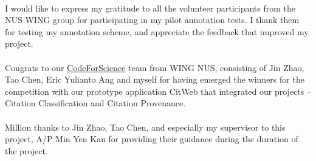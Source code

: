 \documentclass[hyp, 12pt]{socreport}
\begin{document}
\begin{acknowledgement}
\paragraph{}
I would like to express my gratitude to all the volunteer participants from the NUS WING group for participating in my pilot annotation tests. I thank them for testing my annotation scheme, and appreciate the feedback that improved my project.

\paragraph{}
Congrats to our \url{CodeForScience} team from WING NUS, consisting of Jin Zhao, Tao Chen, Eric Yulianto Ang and myself for having emerged the winners for the competition with our prototype application CitWeb that integrated our projects -- Citation Classification and Citation Provenance.

\paragraph{}
Million thanks to Jin Zhao, Tao Chen, and especially my supervisor to this project, A/P Min Yen Kan for providing their guidance during the duration of the project.
\end{acknowledgement}

\listoffigures
\listoftables
\tableofcontents







 



\appendix

\end{document}

